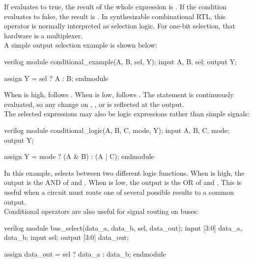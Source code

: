 \noindent If  evaluates to true, the result of the whole expression is
. If the condition evaluates to false, the result is
. In synthesizable combinational RTL, this operator is normally interpreted
as selection logic. For one-bit selection, that hardware is a multiplexer.\\

\noindent A simple output selection example is shown below:

\begin{codeblock}{verilog}
module conditional_example(A, B, sel, Y);
    input A, B, sel;
    output Y;

    assign Y = sel ? A : B;
endmodule
\end{codeblock}

\noindent When  is high,  follows . When
 is low,  follows . The statement is continuously
evaluated, so any change on , , or  is reflected at the
output.\\

\noindent The selected expressions may also be logic expressions rather than simple signals:

\begin{codeblock}{verilog}
module conditional_logic(A, B, C, mode, Y);
    input A, B, C, mode;
    output Y;

    assign Y = mode ? (A & B) : (A | C);
endmodule
\end{codeblock}

\noindent In this example,  selects between two different logic functions. When
 is high, the output is the AND of  and . When
 is low, the output is the OR of  and . This is useful
when a circuit must route one of several possible results to a common output.\\

\noindent Conditional operators are also useful for signal routing on buses:

\begin{codeblock}{verilog}
module bus_select(data_a, data_b, sel, data_out);
    input [3:0] data_a, data_b;
    input sel;
    output [3:0] data_out;

    assign data_out = sel ? data_a : data_b;
endmodule
\end{codeblock}

